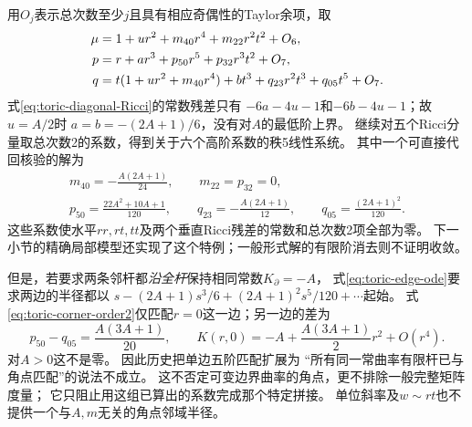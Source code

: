 \documentclass[UTF8,a4paper,11pt,fontset=fandol]{ctexart}
\numberwithin{equation}{section}
\theoremstyle{definition}
\begin{document}
用$O_j$表示总次数至少$j$且具有相应奇偶性的Taylor余项，取
\begin{align}
 \mu&=1+u r^2+m_{40}r^4+m_{22}r^2t^2+O_6,\notag\\
 p&=r+a r^3+p_{50}r^5+p_{32}r^3t^2+O_7,\notag\\
 q&=t(1+u r^2+m_{40}r^4)+b t^3+q_{23}r^2t^3+q_{05}t^5+O_7.
 \label{eq:toric-corner-polynomial}
\end{align}
式\eqref{eq:toric-diagonal-Ricci}的常数残差只有
$-6a-4u-1$和$-6b-4u-1$；故$u=A/2$时
$a=b=-(2A+1)/6$，没有对$A$的最低阶上界。
继续对五个Ricci分量取总次数2的系数，得到关于六个高阶系数的秩5线性系统。
其中一个可直接代回核验的解为
\begin{equation}\label{eq:toric-corner-order2}
 \begin{gathered}
 m_{40}=-\frac{A(2A+1)}{24},\qquad m_{22}=p_{32}=0,\\
 p_{50}=\frac{22A^2+10A+1}{120},\qquad
 q_{23}=-\frac{A(2A+1)}{12},\qquad
 q_{05}=\frac{(2A+1)^2}{120}.
 \end{gathered}
\end{equation}
这些系数使水平$rr,rt,tt$及两个垂直Ricci残差的常数和总次数2项全部为零。
下一小节的精确局部模型还实现了这个特例；一般形式解的有限阶消去则不证明收敛。

但是，若要求两条邻杆都\emph{沿全杆}保持相同常数$K_\partial=-A$，
式\eqref{eq:toric-edge-ode}要求两边的半径都以
$s-(2A+1)s^3/6+(2A+1)^2s^5/120+\cdots$起始。
式\eqref{eq:toric-corner-order2}仅匹配$r=0$这一边；另一边的差为
\begin{equation}\label{eq:toric-corner-mismatch}
 p_{50}-q_{05}=\frac{A(3A+1)}{20},\qquad
 K(r,0)=-A+\frac{A(3A+1)}2r^2+O(r^4).
\end{equation}
对$A>0$这不是零。
因此历史把单边五阶匹配扩展为
“所有同一常曲率有限杆已与角点匹配”的说法不成立。
这不否定可变边界曲率的角点，更不排除一般完整矩阵度量；
它只阻止用这组已算出的系数完成那个特定拼接。
单位斜率及$w\sim rt$也不提供一个与$A,m$无关的角点邻域半径。
\end{document}
